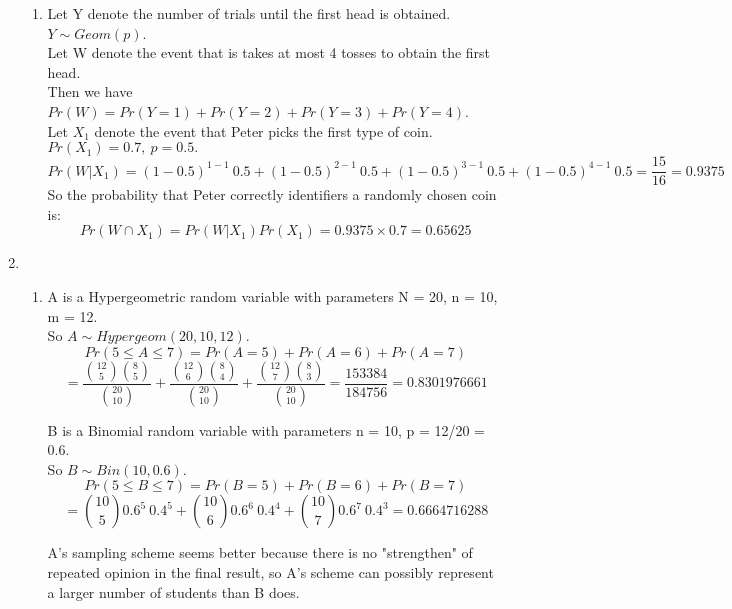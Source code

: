 \documentclass[11pt]{article}
\begin{document}
\begin{enumerate}[label=\textbf{Question \arabic*:},start=1]
\begin{enumerate}
  \item Let Y denote the number of trials until the first head is obtained. \( Y \sim Geom(p) \).\\
Let W denote the event that is takes at most 4 tosses to obtain the first head.\\
Then we have \( Pr(W) = Pr(Y = 1) + Pr(Y = 2) + Pr(Y = 3) + Pr(Y = 4)\). \\
Let \( X_1 \) denote the event that Peter picks the first type of coin. \(Pr(X_1) = 0.7, \  p = 0.5.\) \\
\[
Pr(W | X_1) = (1-0.5)^{1-1} \ 0.5 + (1-0.5)^{2-1}\ 0.5 + (1-0.5)^{3-1} \ 0.5 + (1 - 0.5)^{4-1} \ 0.5 = \frac{15}{16} = 0.9375
\]
So the probability that Peter correctly identifiers a randomly chosen coin is:
\[
Pr(W \cap X_1) = Pr(W | X_1) Pr(X_1) = 0.9375 \times 0.7 = 0.65625
\]
\end{enumerate}





\item 
\begin{enumerate}
  \item A is a Hypergeometric random variable with parameters N = 20, n = 10, m = 12. \\
So \( A \sim Hypergeom(20, 10, 12) \).\\
\[
Pr(5 \leq A \leq 7) = Pr(A = 5) + Pr(A = 6) + Pr(A = 7)
\]
\[
= \frac{{12 \choose 5} {8 \choose 5} }{{20 \choose 10}} + \frac{{12 \choose 6} {8 \choose 4}}{{20 \choose 10}} + \frac{{12 \choose 7} {8 \choose 3}}{{20 \choose 10}} = \frac{153384}{184756} = 0.8301976661
\]

B is a Binomial random variable with parameters n = 10, p = 12/20 = 0.6.\\
So \( B \sim Bin(10, 0.6) \). \\
\[
Pr(5 \leq B \leq 7) = Pr(B = 5) + Pr(B = 6) + Pr(B = 7) 
\]
\[
= {10 \choose 5} 0.6^5 \ 0.4^5 + {10 \choose 6} 0.6^6 \ 0.4^4 + {10 \choose 7} 0.6^7 \ 0.4^3 = 0.6664716288
\]

A's sampling scheme seems better because there is no "strengthen" of repeated opinion in the final result, so A's scheme can possibly represent a larger number of students than B does.\\


\end{enumerate}
\end{enumerate}
\end{document}
